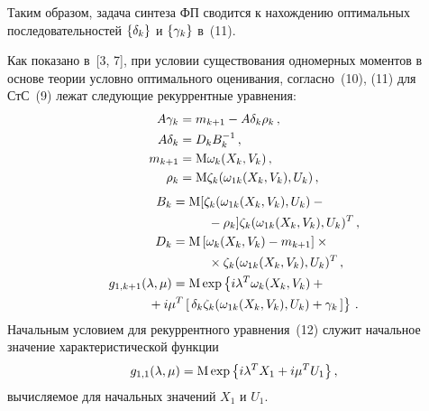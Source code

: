\begin{multicols}{2}
Таким образом, задача синтеза ФП сводится к
нахождению оптимальных последовательностей $\left\{ \delta_k\right\} $ и
$\left\{\gamma_k\right\}$ в~(11).

Как показано в~[3, 7], при условии существования одномерных
моментов в основе теории условно оптимального оценивания, согласно~(10),
(11) для СтС~(9) лежат следующие рекуррентные уравнения:
\begin{align}
A\gamma_k &= m_{k+1} - A \delta_k \rho_k\,,\notag\\
A\delta_k &= D_k B_k^{-1}\,,\notag\\
 m_{k+1}&= {\rm M} \w_k (X_k, V_k)\,,\notag\\
 \rho_k &= {\rm M} \zeta_k (\w_{1k} (X_k, V_k) , U_k)\,,\notag %
 \end{align}
\begin{align}
        B_k &= {\rm M} [ \zeta_k (\w_{1k} (X_k, V_k), U_k) -{}\notag\\
&\hspace*{10mm}  {}- \rho_k ] \zeta_k (\w_{1k} (X_k, V_k),U_k)^T\,,\notag \\
D_k &=\mathrm{M} \left[ \w_k (X_k, V_k) - m_{k+1}\right ]\times{}\notag\\
&\hspace*{10mm}  {}\times \zeta_k (\w_{1k} (X_k, V_k), U_k)^T\,,\notag \\
     g_{1,k+1} (\la,\mu) &= {\rm M} \exp\lf i \la^T \w_k (X_k, V_k) +{}\right.\notag\\
&\!\!\!\!\!\!\!\!\!\!\!\!\!\left. {}+ i\mu^T \lk \delta_k
     \zeta_k( \w_{1k} (X_k, V_k), U_k) + \gamma_k\rk\rf\,.
\end{align}
Начальным условием для рекуррентного уравнения~(12) служит
начальное значение характеристической функции
 $$g_{1,1} (\lambda, \mu) ={\rm M} \exp \left\{ i\lambda^T X_1 + i\mu^T U_1\right\},$$
вычисляемое для начальных значений $X_1$ и $U_1$.


\end{multicols}
